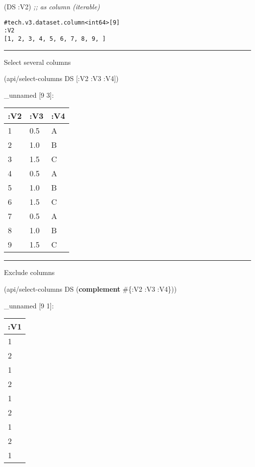 \documentclass[]{article}
\newenvironment{Shaded}{\begin{snugshade}}{\end{snugshade}}
\newcommand{\AttributeTok}[1]{\textcolor[rgb]{0.77,0.63,0.00}{#1}}
\newcommand{\CommentTok}[1]{\textcolor[rgb]{0.56,0.35,0.01}{\textit{#1}}}
\newcommand{\KeywordTok}[1]{\textcolor[rgb]{0.13,0.29,0.53}{\textbf{#1}}}
\newcommand{\NormalTok}[1]{#1}
\begin{document}
\begin{Shaded}
\begin{Highlighting}[]
\NormalTok{(DS }\AttributeTok{:V2}\NormalTok{) }\CommentTok{;; as column (iterable)}
\end{Highlighting}
\end{Shaded}

\begin{verbatim}
#tech.v3.dataset.column<int64>[9]
:V2
[1, 2, 3, 4, 5, 6, 7, 8, 9, ]
\end{verbatim}

\begin{center}\rule{0.5\linewidth}{0.5pt}\end{center}

Select several columns

\begin{Shaded}
\begin{Highlighting}[]
\NormalTok{(api/select-columns DS [}\AttributeTok{:V2} \AttributeTok{:V3} \AttributeTok{:V4}\NormalTok{])}
\end{Highlighting}
\end{Shaded}

\_unnamed {[}9 3{]}:

\begin{longtable}[]{@{}lll@{}}
\toprule
:V2 & :V3 & :V4\tabularnewline
\midrule
\endhead
1 & 0.5 & A\tabularnewline
2 & 1.0 & B\tabularnewline
3 & 1.5 & C\tabularnewline
4 & 0.5 & A\tabularnewline
5 & 1.0 & B\tabularnewline
6 & 1.5 & C\tabularnewline
7 & 0.5 & A\tabularnewline
8 & 1.0 & B\tabularnewline
9 & 1.5 & C\tabularnewline
\bottomrule
\end{longtable}

\begin{center}\rule{0.5\linewidth}{0.5pt}\end{center}

Exclude columns

\begin{Shaded}
\begin{Highlighting}[]
\NormalTok{(api/select-columns DS (}\KeywordTok{complement}\NormalTok{ #\{}\AttributeTok{:V2} \AttributeTok{:V3} \AttributeTok{:V4}\NormalTok{\}))}
\end{Highlighting}
\end{Shaded}

\_unnamed {[}9 1{]}:

\begin{longtable}[]{@{}l@{}}
\toprule
:V1\tabularnewline
\midrule
\endhead
1\tabularnewline
2\tabularnewline
1\tabularnewline
2\tabularnewline
1\tabularnewline
2\tabularnewline
1\tabularnewline
2\tabularnewline
1\tabularnewline
\bottomrule
\end{longtable}
\end{document}
